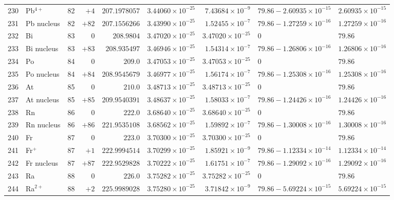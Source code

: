 {\begin{tabular}{@{}r l r r r r r l l@{}}
230 & Pb$^{4+}$ & 82 & $+4$ & $207.1978057$ & $3.44060{\times}10^{-25}$ & $7.43684{\times}10^{-9}$ & $79.86 - 2.60935{\times}10^{-15}$ & $2.60935{\times}10^{-15}$ \\
231 & Pb nucleus & 82 & $+82$ & $207.1556266$ & $3.43990{\times}10^{-25}$ & $1.52455{\times}10^{-7}$ & $79.86 - 1.27259{\times}10^{-16}$ & $1.27259{\times}10^{-16}$ \\
232 & Bi & 83 & $0$ & $208.9804$ & $3.47020{\times}10^{-25}$ & $3.47020{\times}10^{-25}$ & $0$ & $79.86$ \\
233 & Bi nucleus & 83 & $+83$ & $208.935497$ & $3.46946{\times}10^{-25}$ & $1.54314{\times}10^{-7}$ & $79.86 - 1.26806{\times}10^{-16}$ & $1.26806{\times}10^{-16}$ \\
234 & Po & 84 & $0$ & $209.0$ & $3.47053{\times}10^{-25}$ & $3.47053{\times}10^{-25}$ & $0$ & $79.86$ \\
235 & Po nucleus & 84 & $+84$ & $208.9545679$ & $3.46977{\times}10^{-25}$ & $1.56174{\times}10^{-7}$ & $79.86 - 1.25308{\times}10^{-16}$ & $1.25308{\times}10^{-16}$ \\
236 & At & 85 & $0$ & $210.0$ & $3.48713{\times}10^{-25}$ & $3.48713{\times}10^{-25}$ & $0$ & $79.86$ \\
237 & At nucleus & 85 & $+85$ & $209.9540391$ & $3.48637{\times}10^{-25}$ & $1.58033{\times}10^{-7}$ & $79.86 - 1.24426{\times}10^{-16}$ & $1.24426{\times}10^{-16}$ \\
238 & Rn & 86 & $0$ & $222.0$ & $3.68640{\times}10^{-25}$ & $3.68640{\times}10^{-25}$ & $0$ & $79.86$ \\
239 & Rn nucleus & 86 & $+86$ & $221.9535108$ & $3.68562{\times}10^{-25}$ & $1.59892{\times}10^{-7}$ & $79.86 - 1.30008{\times}10^{-16}$ & $1.30008{\times}10^{-16}$ \\
240 & Fr & 87 & $0$ & $223.0$ & $3.70300{\times}10^{-25}$ & $3.70300{\times}10^{-25}$ & $0$ & $79.86$ \\
241 & Fr$^{+}$ & 87 & $+1$ & $222.9994514$ & $3.70299{\times}10^{-25}$ & $1.85921{\times}10^{-9}$ & $79.86 - 1.12334{\times}10^{-14}$ & $1.12334{\times}10^{-14}$ \\
242 & Fr nucleus & 87 & $+87$ & $222.9529828$ & $3.70222{\times}10^{-25}$ & $1.61751{\times}10^{-7}$ & $79.86 - 1.29092{\times}10^{-16}$ & $1.29092{\times}10^{-16}$ \\
243 & Ra & 88 & $0$ & $226.0$ & $3.75282{\times}10^{-25}$ & $3.75282{\times}10^{-25}$ & $0$ & $79.86$ \\
244 & Ra$^{2+}$ & 88 & $+2$ & $225.9989028$ & $3.75280{\times}10^{-25}$ & $3.71842{\times}10^{-9}$ & $79.86 - 5.69224{\times}10^{-15}$ & $5.69224{\times}10^{-15}$ \\

\end{tabular}}
